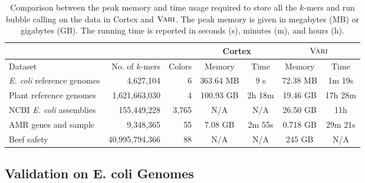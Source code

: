 

\begin{table*}%
  \small
  \centering
  \begin{tabular}{| l | r | r | c | c | c |c |}
   	\hline
	\multicolumn{1}{|l}{}
   	& \multicolumn{1}{r}{}	
	& \multicolumn{1}{r}{} 
	& \multicolumn{2}{c|}{{\sc Cortex}} 
	& \multicolumn{2}{|c|}{$\mbox{\rm {\sc Vari}}$}  \\
	\hline
	 Dataset & No. of $k$-mers & Colors & Memory & Time & Memory & Time \\
	\hline
	\emph{E. coli} reference genomes			& 4,627,104 		& 6 	& 363.64 MB 	& 9 s 	& 72.38 MB  	& 1m 19s\\
	Plant reference genomes					& 1,621,663,030 	& 4 	& 100.93 GB 	& 2h 18m	& 19.46 GB 	& 17h 28m\\
    NCBI \emph{E. coli} assemblies          & 155,449,228       & 3,765 & N/A        & N/A      &  26.50 GB      & 11h \\
	AMR genes and sample 					& 9,348,365 		& 55 	& 7.08 GB 	& 2m 55s	& 0.718 GB 	& 29m 21s \\ 
    Beef safety                             & 40,995,794,366    & 88    & N/A        & N/A   & 245 GB     & N/A \\
 	\hline
	\end{tabular}
  \caption{Comparison between the peak memory and time usage required to store all the $k$-mers and run bubble calling on the data in {\sc Cortex} and $\mbox{\rm {\sc Vari}}$.
    The peak memory is given in megabytes (MB) or gigabytes (GB). The running time is reported in seconds (s), minutes (m), and hours (h).}
 \label{tbl-cosmo}
\end{table*}

\subsection{Validation on E. coli Genomes}


